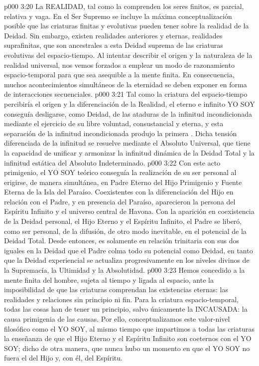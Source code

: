 \vs p000 3:20 \pc La REALIDAD, tal como la comprenden los seres finitos, es parcial, relativa y vaga. En el Ser Supremo se incluye la máxima conceptualización posible que las criaturas finitas y evolutivas pueden tener sobre la realidad de la Deidad. Sin embargo, existen realidades anteriores y eternas, realidades suprafinitas, que son ancestrales a esta Deidad suprema de las criaturas evolutivas del espacio\hyp{}tiempo. Al intentar describir el origen y la naturaleza de la realidad universal, nos vemos forzados a emplear un modo de razonamiento espacio\hyp{}temporal para que sea asequible a la mente finita. En consecuencia, muchos acontecimientos simultáneos de la eternidad se deben exponer en forma de interacciones secuenciales.
\vs p000 3:21 Tal como la criatura del espacio\hyp{}tiempo percibiría el origen y la diferenciación de la Realidad, el eterno e infinito YO SOY conseguía desligarse, como Deidad, de las ataduras de la infinitud incondicionada mediante el ejercicio de su libre voluntad, consustancial y eterna, y esta separación de la infinitud incondicionada produjo la primera . Dicha tensión diferenciada de la infinitud se resuelve mediante el Absoluto Universal, que tiene la capacidad de unificar y armonizar la infinitud dinámica de la Deidad Total y la infinitud estática del Absoluto Indeterminado.
\vs p000 3:22 Con este acto primigenio, el YO SOY teórico conseguía la realización de su ser personal al erigirse, de manera simultánea, en Padre Eterno del Hijo Primigenio y Fuente Eterna de la Isla del Paraíso. Coexistentes con la diferenciación del Hijo en relación con el Padre, y en presencia del Paraíso, aparecieron la persona del Espíritu Infinito y el universo central de Havona. Con la aparición en coexistencia de la Deidad personal, el Hijo Eterno y el Espíritu Infinito, el Padre se liberó, como ser personal, de la difusión, de otro modo inevitable, en el potencial de la Deidad Total. Desde entonces, es solamente en relación trinitaria con sus dos iguales en la Deidad que el Padre colma todo su potencial como Deidad, en tanto que la Deidad experiencial se actualiza progresivamente en los niveles divinos de la Supremacía, la Ultimidad y la Absolutidad.
\vs p000 3:23 \pc Hemos concedido  a la mente finita del hombre, sujeta al tiempo y ligada al espacio, ante la imposibilidad de que las criaturas comprendan las existencias eternas: las realidades y relaciones sin principio ni fin. Para la criatura espacio\hyp{}temporal, todas las cosas han de tener un principio, salvo únicamente la INCAUSADA: la causa primigenia de las causas. Por ello, conceptualizamos este valor\hyp{}nivel filosófico como el YO SOY, al mismo tiempo que impartimos a todas las criaturas la enseñanza de que el Hijo Eterno y el Espíritu Infinito son coeternos con el YO SOY; dicho de otra manera, que nunca hubo un momento en que el YO SOY no fuera el  del Hijo y, con él, del Espíritu.
